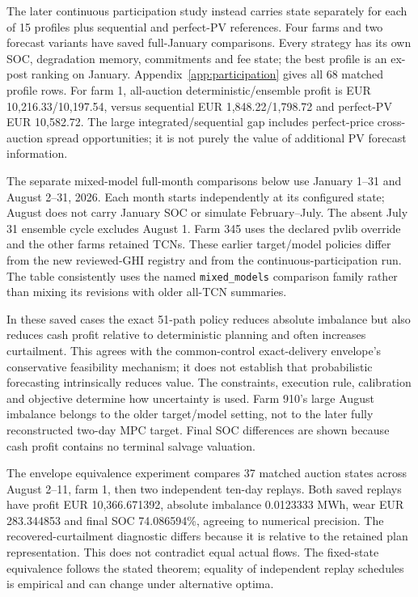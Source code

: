 The later continuous participation study instead carries state separately for
each of 15 profiles plus sequential and perfect-PV references. Four farms and
two forecast variants have saved full-January comparisons. Every strategy has
its own SOC, degradation memory, commitments and fee state; the best profile
is an ex-post ranking on January. Appendix~\ref{app:participation} gives all
68 matched profile rows. For farm 1, all-auction deterministic/ensemble profit
is EUR 10,216.33/10,197.54, versus sequential EUR 1,848.22/1,798.72 and
perfect-PV EUR 10,582.72. The large integrated/sequential gap includes
perfect-price cross-auction spread opportunities; it is not purely the value
of additional PV forecast information.

The separate mixed-model full-month comparisons below use January 1--31 and
August 2--31, 2026. Each month starts independently at its configured state;
August does not carry January SOC or simulate February--July. The absent
July 31 ensemble cycle excludes August 1. Farm 345 uses the declared pvlib
override and the other farms retained TCNs. These earlier target/model policies
differ from the new reviewed-GHI registry and from the continuous-participation
run. The table consistently uses the named \texttt{mixed\_models} comparison
family rather than mixing its revisions with older all-TCN summaries.

In these saved cases the exact 51-path policy reduces absolute imbalance but
also reduces cash profit relative to deterministic planning and often increases
curtailment. This agrees with the common-control exact-delivery envelope's
conservative feasibility mechanism; it does not establish that probabilistic
forecasting intrinsically reduces value. The constraints, execution rule,
calibration and objective determine how uncertainty is used. Farm 910's large
August imbalance belongs to the older target/model setting, not to the later
fully reconstructed two-day MPC target. Final SOC differences are shown because
cash profit contains no terminal salvage valuation.

The envelope equivalence experiment compares 37 matched auction states across
August 2--11, farm 1, then two independent ten-day replays. Both saved replays
have profit EUR 10,366.671392, absolute imbalance 0.0123333 MWh, wear
EUR 283.344853 and final SOC 74.086594\%, agreeing to numerical precision.
The recovered-curtailment diagnostic differs because it is relative to the
retained plan representation. This does not contradict equal actual flows.
The fixed-state equivalence follows the stated theorem; equality of independent
replay schedules is empirical and can change under alternative optima.

